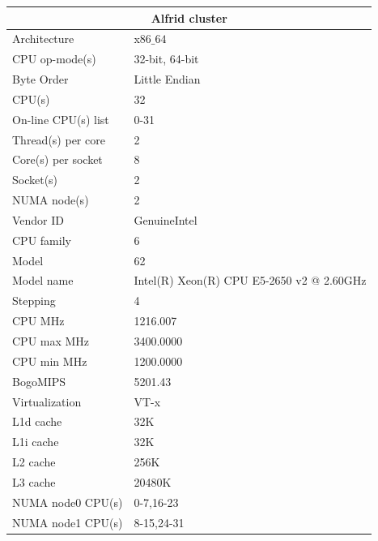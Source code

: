 \begin{tabular}{ |p{4cm}|p{8.8cm}| }
\hline
\multicolumn{2}{|c|}{Alfrid cluster} \\
\hline
\hline
Architecture &          x$86\_64$ \\
\hline
CPU op-mode(s) &        32-bit, 64-bit \\
\hline
Byte Order &            Little Endian \\
\hline
CPU(s) &                32 \\
\hline
On-line CPU(s) list &   0-31 \\
\hline
Thread(s) per core &    2 \\
\hline
Core(s) per socket &    8 \\
\hline
Socket(s) &             2 \\
\hline
NUMA node(s) &          2 \\
\hline
Vendor ID &             GenuineIntel \\
\hline
CPU family &            6 \\
\hline
Model &                 62 \\
\hline
Model name &            Intel(R) Xeon(R) CPU E5-2650 v2 @ 2.60GHz \\
\hline
Stepping &              4 \\
\hline
CPU MHz &               1216.007 \\
\hline
CPU max MHz &           3400.0000 \\
\hline
CPU min MHz &           1200.0000 \\
\hline
BogoMIPS &              5201.43 \\
\hline
Virtualization &        VT-x \\
\hline
L1d cache &            32K \\
\hline
L1i cache &            32K \\
\hline
L2 cache &            256K \\
\hline
L3 cache &              20480K \\
\hline
NUMA node0 CPU(s) &     0-7,16-23 \\
\hline
NUMA node1 CPU(s) &     8-15,24-31 \\
 \hline
 \end{tabular}